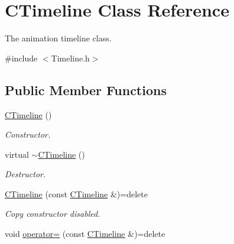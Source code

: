 \hypertarget{class_c_timeline}{\section{C\+Timeline Class Reference}
\label{class_c_timeline}
}


The animation timeline class.  




{\ttfamily \#include $<$Timeline.\+h$>$}

\subsection*{Public Member Functions}
\begin{DoxyCompactItemize}
\item 
\hypertarget{class_c_timeline_ab635cefbd9093370e384b3b6eab9f538}{\hyperlink{class_c_timeline_ab635cefbd9093370e384b3b6eab9f538}{C\+Timeline} ()}\label{class_c_timeline_ab635cefbd9093370e384b3b6eab9f538}

\begin{DoxyCompactList}\small\item\em Constructor. \end{DoxyCompactList}\item 
\hypertarget{class_c_timeline_a751f5ee4922951e58c0e8aeabc763de4}{virtual \hyperlink{class_c_timeline_a751f5ee4922951e58c0e8aeabc763de4}{$\sim$\+C\+Timeline} ()}\label{class_c_timeline_a751f5ee4922951e58c0e8aeabc763de4}

\begin{DoxyCompactList}\small\item\em Destructor. \end{DoxyCompactList}\item 
\hypertarget{class_c_timeline_adde2f3adeeec5df639c42f0d2f2fa656}{\hyperlink{class_c_timeline_adde2f3adeeec5df639c42f0d2f2fa656}{C\+Timeline} (const \hyperlink{class_c_timeline}{C\+Timeline} \&)=delete}\label{class_c_timeline_adde2f3adeeec5df639c42f0d2f2fa656}

\begin{DoxyCompactList}\small\item\em Copy constructor disabled. \end{DoxyCompactList}\item 
\hypertarget{class_c_timeline_a3baad1e0caf007042b8f4baeb5e9705f}{void \hyperlink{class_c_timeline_a3baad1e0caf007042b8f4baeb5e9705f}{operator=} (const \hyperlink{class_c_timeline}{C\+Timeline} \&)=delete}\label{class_c_timeline_a3baad1e0caf007042b8f4baeb5e9705f}


\end{DoxyCompactItemize}
